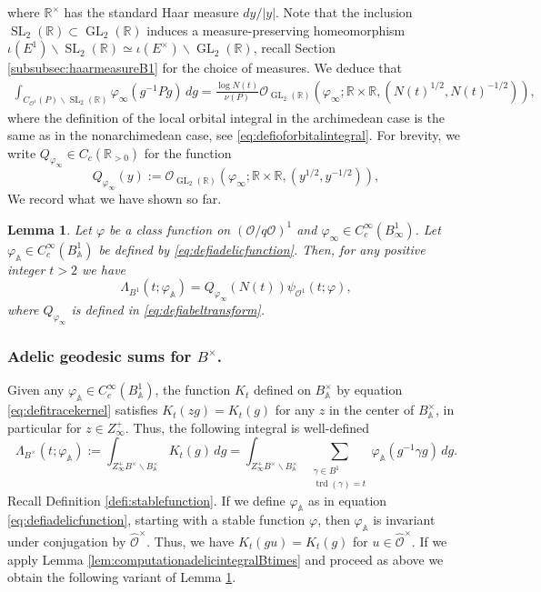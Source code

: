 \documentclass{article}
\newtheorem{lem}{Lemma}[section]
\theoremstyle{named}
\newcommand{\A}{\mathbb{A}}
\newcommand{\R}{\mathbb{R}}
\renewcommand{\O}{\mathcal{O}}
\DeclareMathOperator{\SL}{SL}
\DeclareMathOperator{\GL}{GL}
\DeclareMathOperator{\trd}{trd}
\begin{document}
where $\R^\times$ has the standard Haar measure $dy/|y|$. 
Note that the inclusion $\SL_2(\R) \subset \GL_2(\R)$ induces a measure-preserving homeomorphism $\iota(E^1)\backslash \SL_2(\R) \simeq \iota(E^\times)\backslash \GL_2(\R)$, recall Section \ref{subsubsec:haarmeasureB1} for the choice of measures. We deduce that 
\begin{equation*}
\begin{aligned}
    \int_{C_{\O^1}(P)\backslash \SL_2(\R)} \varphi_\infty(g^{-1}P g)\, dg  = \frac{\log N(t)}{\nu(P)} \O_{\GL_2(\R)}(\varphi_\infty; \R \times \R, (N(t)^{1/2}, N(t)^{-1/2})),
\end{aligned}
\end{equation*}
where the definition of the local orbital integral in the archimedean case is the same as in the nonarchimedean case, see \eqref{eq:defioforbitalintegral}.
For brevity, we write $Q_{\varphi_\infty} \in C_c(\R_{> 0})$ for the function 
\begin{equation}\label{eq:defiabeltransform}
    Q_{\varphi_\infty}(y) :=  \O_{\GL_2(\R)}(\varphi_\infty; \R \times \R, (y^{1/2}, y^{-1/2})),
\end{equation}
We record what we have shown so far. 
\begin{lem}\label{lem:adelicclassicalcomparisonB1fixedt}
Let $\varphi$ be a class function on $(\O/q\O)^1$ and $\varphi_\infty \in C_c^\infty(B_\infty^1)$. Let $\varphi_\A \in C_c^\infty(B_\A^1)$ be defined by \eqref{eq:defiadelicfunction}. Then, for any positive integer $t > 2$ we have 
\begin{equation*}
    \Lambda_{B^1}(t; \varphi_\A) = Q_{\varphi_\infty}(N(t))\psi_{\O^1}(t; \varphi),
\end{equation*}
where $Q_{\varphi_\infty}$ is defined in \eqref{eq:defiabeltransform}.
\end{lem}


\subsubsection{Adelic geodesic sums for $B^\times$.}
Given any $\varphi_\A \in C_c^\infty(B_\A^1)$, the function $K_t$ defined on $B_\A^\times$ by equation \eqref{eq:defitracekernel} satisfies $K_t(zg) = K_t(g)$ for any $z$ in the center of $B_\A^\times$, in particular for $z \in Z_\infty^+$. Thus, the following integral is well-defined
\begin{equation}\label{eq:adelicdefinitionhyperbolictermBtimes}
    \Lambda_{B^\times}(t; \varphi_\A) := \int_{Z_\infty^+ B^\times\backslash B_\A^\times} K_t(g) \, dg = \int_{Z_\infty^+ B^\times \backslash B_\A^\times}  \sum_{\substack{\gamma \in B^1\\\trd(\gamma) = t}} \varphi_\A(g^{-1}\gamma g) \, dg. 
\end{equation}
Recall Definition \ref{defi:stablefunction}.
If we define $\varphi_\A$ as in equation \eqref{eq:defiadelicfunction}, starting with a stable function $\varphi$, then $\varphi_\A$ is invariant under conjugation by $\widehat{\O}^\times$. Thus, we have $K_t(gu)  = K_t(g)$ for $u \in \widehat{\O}^\times$. If we apply Lemma \ref{lem:computationadelicintegralBtimes} and proceed as above we obtain the following variant of Lemma \ref{lem:adelicclassicalcomparisonB1fixedt}. 
\end{document}
